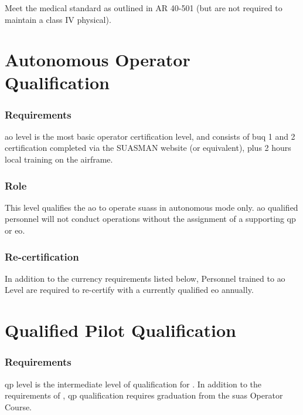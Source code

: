             \subsubsection{} Meet the medical standard as outlined in AR 40-501 (but are not required to maintain a class IV physical).

    \section{Autonomous Operator Qualification}\label{sec:qual-ao}
    
            \subsubsection{Requirements} \acf{ao} level is the most basic operator certification level, and consists of \ac{buq} 1 and 2 certification completed via the SUASMAN website (or equivalent), plus 2 hours local training on the \projectmars{} airframe.  
            
            \subsubsection{Role}This level qualifies the \ac{ao} to operate \projectmars{} \ac{suas}s in autonomous mode  only. \ac{ao} qualified personnel will not conduct operations without the assignment of a supporting \ac{qp} or \ac{eo}. 
        
            \subsubsection{Re-certification}In addition to the currency requirements listed below, Personnel trained to \ac{ao} Level are required to re-certify with a currently qualified \ac{eo} annually. 

    \section{Qualified Pilot Qualification}\label{sec:qual-qp} 
            
            \subsubsection{Requirements}\acf{qp} level is the intermediate level of qualification for \projectmars{}. In addition to the requirements of , \ac{qp} qualification requires graduation from the \ac{suas} Operator Course. 

